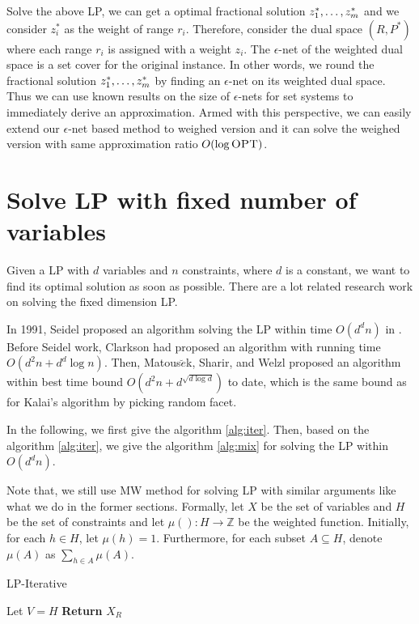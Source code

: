 \documentclass[11pt]{article}
\newcommand{\opt}{\textrm{\sc OPT}}
\begin{document}
Solve the above LP, we can get a optimal fractional solution $z_1^*\. z_m^*$ and we consider $z_i^*$ as the weight of range $r_i.$
Therefore, consider the dual space $(R,P^*)$ where each range $r_i$ is assigned with a weight $z_i$. 
The $\epsilon$-net of the weighted dual space is a set cover for the original instance. 
In other words, we round the fractional solution $z_1^*\. z_m^*$ by finding an $\epsilon$-net on its weighted dual space. 
Thus we can use known results on the size of $\epsilon$-nets for set systems to immediately derive an approximation.
Armed with this perspective, we can easily extend our $\epsilon$-net based method to weighed version and it 
	can solve the weighed version with same approximation ratio $O(\log \opt)$.

\section{Solve LP with fixed number of variables}

Given a LP with $d$ variables and $n$ constraints, where $d$ is a constant, we want to find its optimal solution as soon as possible. 
There are a lot related  research work on solving the fixed dimension LP. 

In 1991, Seidel proposed an algorithm solving the LP within time $O(d^d n)$ in  \cite{seidel1991small}.
Before Seidel work, Clarkson had proposed an algorithm with running time $O(d^2n+d^d\log n)$. 
Then, Matous$\breve{e}$k, Sharir, and Welzl proposed an algorithm within best time bound $O(d^2n+d^{\sqrt{d\log d}})$ to date,
	which is the same bound as for Kalai's algorithm  by picking random facet. 


In the following, we first give the algorithm \ref{alg:iter}. Then, based on the algorithm \ref{alg:iter}, we give the algorithm \ref{alg:mix} for solving the LP 
	within $O(d^d n)$.

Note that, we still use MW method for solving LP with similar arguments like what we do in the former sections.
Formally,  
let $X$ be the set of variables and  $H$ be the set of constraints and let $\mu():H\rightarrow \mathbb{Z}$ be the weighted function. 
Initially, for each $h\in H$, let $\mu(h)=1$.
Furthermore, for each subset $A\subseteq  H$, denote $\mu(A)$ as  $\sum_{h\in A}\mu(A)$.

\begin{algorithm}[h]
\caption{LP-Iterative}
\label{alg:iter}
Let $V=H$\;
	{\bf Return} $X_R$\;
\end{algorithm}
\end{document}
